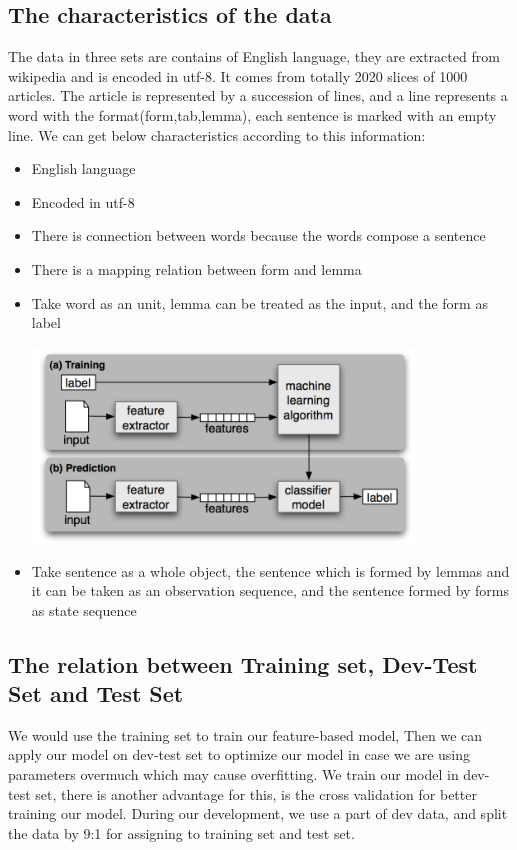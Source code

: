 \documentclass[a4paper]{article}
\begin{document}
\subsection{The characteristics of the data}
The data in three sets are contains of English language, they are extracted from wikipedia and is encoded in utf-8. It comes from totally 2020 slices of 1000 articles. The article is represented by a succession of lines, and a line represents a word with the format(form,tab,lemma), each sentence is marked with an empty line. We can get below characteristics according to this information:
\begin{itemize}
\item English language
\item Encoded in utf-8
\item There is connection between words because the words compose a sentence
\item There is a mapping relation between form and lemma
\item Take word as an unit, lemma can be treated as the input, and the form as label
\begin{center}
\includegraphics[width=0.8\textwidth]{process_flow.png}
\end{center}
\item Take sentence as a whole object, the sentence which is formed by lemmas and it can be taken as an observation sequence, and the sentence formed by forms as state sequence


\end{itemize}

\subsection{The relation between Training set, Dev-Test Set and Test Set}

We would use the training set to train our feature-based model, Then we can apply our model on dev-test set to optimize our model in case we are using  parameters overmuch which may cause overfitting. We train our model in dev-test set, there is another advantage for this, is the cross validation for better training our model. During our development, we use a part of dev data, and split the data by 9:1 for assigning to training set and test set.
\end{document}
